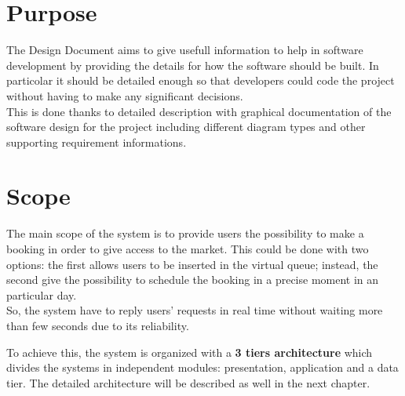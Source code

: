 \section{Purpose}
The Design Document aims to give usefull information to help in software development by providing the details for how the software should be built. In particolar it should be detailed enough so that developers could code the project without having to make any significant decisions. \\
This is done thanks to detailed description with graphical documentation of the software design for the project including different diagram types and other supporting requirement informations.
\section{Scope}
The main scope of the system is to provide users the possibility to make a booking in order to give access to the market. This could be done with two options: the first allows users to be inserted in the virtual queue; instead, the second give the possibility to schedule the booking in a precise moment in an particular day. \\
So, the system have to reply users' requests in real time without waiting more than few seconds due to its reliability. \par
To achieve this, the system is organized with a \textbf{3 tiers architecture} which divides the systems in independent modules: presentation, application and a data tier. The detailed architecture will be described as well in the next chapter.

\begin{comment}
in which a presentation layer runs on a client, and a data and application layers get stored on a server. [TODO]
The client side in particolar is composed by two different applications with the same functionalites:
\begin{itemize}
\item \textbf{CLup}: It's the application used by users who have a smartphone. They can manage their booking by themselves;
\item \textbf{CLup Operator}: It's the application used by receptionists who act as an intermediary to manage booking of users that have only a mobilephone.
\end{itemize}

Instead the server side contains:

\begin{itemize}
\item \textbf{Application layer}: it accounts for managing the users' entrances and for a proper operation of the system;
\item \textbf{Data layer}: it stores information and personal data of each users;
\end{itemize}

\end{comment}
\bigskip
\bigskip
